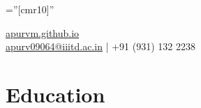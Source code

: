 \documentclass[a4paper,10pt]{article} %
\begin{document}
\pagestyle{empty} %

\font\fb=''[cmr10]'' %

\par{\par} %
\center {}\href{https://apurvm.github.io}{apurvm.github.io}\\
\href{mailto:apurv09064@iiitd.ac.in}{apurv09064@iiitd.ac.in} | +91 (931) 132 2238 %



\section {\color{red} Education}
\end{document}
